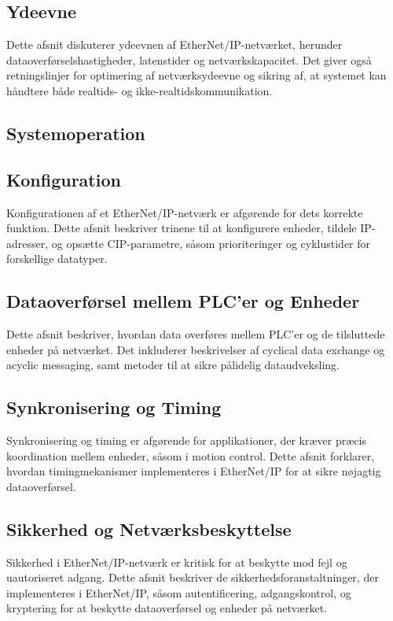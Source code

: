 \subsection{Ydeevne}
Dette afsnit diskuterer ydeevnen af EtherNet/IP-netværket, herunder dataoverførselshastigheder, latenstider og netværkskapacitet. Det giver også retningslinjer for optimering af netværksydeevne og sikring af, at systemet kan håndtere både realtids- og ikke-realtidskommunikation.

\subsection{Systemoperation}
\subsection*{Konfiguration}
Konfigurationen af et EtherNet/IP-netværk er afgørende for dets korrekte funktion. Dette afsnit beskriver trinene til at konfigurere enheder, tildele IP-adresser, og opsætte CIP-parametre, såsom prioriteringer og cyklustider for forskellige datatyper.

\subsection*{Dataoverførsel mellem PLC'er og Enheder}
Dette afsnit beskriver, hvordan data overføres mellem PLC'er og de tilsluttede enheder på netværket. Det inkluderer beskrivelser af cyclical data exchange og acyclic messaging, samt metoder til at sikre pålidelig dataudveksling.

\subsection*{Synkronisering og Timing}
Synkronisering og timing er afgørende for applikationer, der kræver præcis koordination mellem enheder, såsom i motion control. Dette afsnit forklarer, hvordan timingmekanismer implementeres i EtherNet/IP for at sikre nøjagtig dataoverførsel.

\subsection*{Sikkerhed og Netværksbeskyttelse}
Sikkerhed i EtherNet/IP-netværk er kritisk for at beskytte mod fejl og uautoriseret adgang. Dette afsnit beskriver de sikkerhedsforanstaltninger, der implementeres i EtherNet/IP, såsom autentificering, adgangskontrol, og kryptering for at beskytte dataoverførsel og enheder på netværket.

